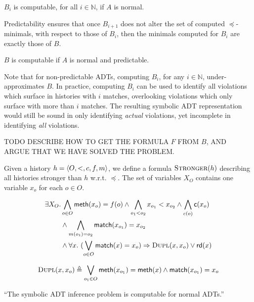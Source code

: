 \begin{lemma}

  $B_i$ is computable, for all $i \in \mathbb{N}$, if $A$ is normal.

\end{lemma}

Predictability ensures that once $B_{i+1}$ does not alter the set of computed
$\preceq$-minimals, with respect to those of $B_i$, then the minimals computed
for $B_i$ are exactly those of $B$.

\begin{lemma}

  $B$ is computable if $A$ is normal and predictable.

\end{lemma}

Note that for non-predictable ADTs, computing $B_i$, for any $i \in
\mathbb{N}$, under-approximates $B$. In practice, computing $B_i$ can be used
to identify all violations which surface in histories with $i$ matches,
overlooking violations which only surface with more than $i$ matches. The
resulting symbolic ADT representation would still be sound in only identifying
\emph{actual} violations, yet incomplete in identifying \emph{all} violations.

TODO DESCRIBE HOW TO GET THE FORMULA $F$ FROM $B$, AND ARGUE THAT WE HAVE
SOLVED THE PROBLEM.

Given a history $h = {\left\langle{O,<,c,f,m}\right\rangle}$, we define a formula $\textsc{Stronger}(h)$
describing all histories stronger than $h$ w.r.t. $\preceq$. The set of variables $X_O$
contains one variable $x_o$ for each $o\in O$.

\begin{align*}
\exists X_O. & \bigwedge_{o\in O} {\sf meth}(x_o)=f(o) \land \bigwedge_{o_1<o_2} x_{o_1} < x_{o_2}\land \bigwedge_{c(o)} {\sf c}(x_o) \\
& \land \bigwedge_{m(o_1)=o_2} {\sf match}(x_{o_1}) = x_{o_2} \\
& \land \forall x.\  (\bigvee_{o\in O} {\sf match}(x) = x_o)\Rightarrow \textsc{Dupl}(x,x_o)\vee {\sf rd}(x)  
\end{align*}

\begin{align*}
\textsc{Dupl}(x,x_o) \triangleq \bigvee_{o_1\in O} {\sf meth}(x_{o_1}) = {\sf meth}(x) \land {\sf match}(x_{o_1})=x_o
\end{align*}

\begin{theorem}

  “The symbolic ADT inference problem is computable for normal ADTs.”

\end{theorem}
